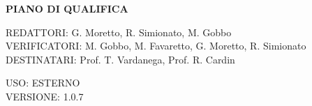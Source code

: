\documentclass[5pt]{article}
\begin{document}
	\vspace{24pt}
	
	\begin{center}
		\textbf{\LARGE PIANO DI QUALIFICA}
	\end{center}
	
	\vspace{13pt}
	
	\begin{flushleft}
		\begin{spacing}{1.5}
			REDATTORI: G. Moretto, R. Simionato, M. Gobbo\\%
			VERIFICATORI: M. Gobbo, M. Favaretto, G. Moretto, R. Simionato\\
			\vspace{7pt}
			DESTINATARI: Prof. T. Vardanega, Prof. R. Cardin\\%
		\end{spacing}
	\end{flushleft}
	
	\begin{flushright}
		\begin{spacing}{1}
			USO: ESTERNO\\
			VERSIONE: 1.0.7\\
		\end{spacing}
	\end{flushright}
	
	
	\restoregeometry
	
	\pagebreak
	
\end{document}
